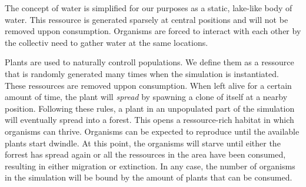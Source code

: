 The concept of water is simplified for our purposes as a static, lake-like body of water.
This ressource is generated sparsely at central positions and will not be removed uppon consumption.
Organisms are forced to interact with each other by the collectiv need to gather water at the same locations.

Plants are used to naturally controll populations. We define them as a ressource that is randomly generated
many times when the simulation is instantiated. These ressources are removed uppon consumption. When left 
alive for a certain amount of time, the plant will \emph{spread} by spawning a clone of itself at a nearby position.
Following these rules, a plant in an unpopulated part of the simulation will eventually spread into a forest.
This opens a ressource-rich habitat in which organisms can thrive. Organisms can be expected to 
reproduce until the available plants start dwindle. At this point, the organisms will starve until either 
the forrest has spread again or all the ressources in the area have been consumed, resulting in either
migration or extinction. In any case, the number of organisms in the simulation will be bound by the amount of 
plants that can be consumed.
